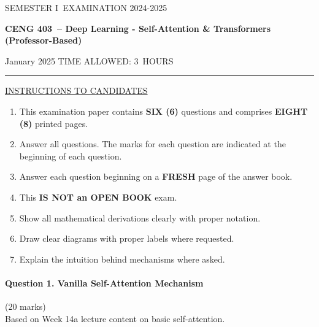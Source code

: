 \documentclass[12pt]{article}
\newcommand{\masunitnumber}{CENG 403}
\newcommand{\examdate}{January 2025}
\newcommand{\academicyear}{2024-2025}
\newcommand{\semester}{I}
\newcommand{\coursename}{Deep Learning - Self-Attention \& Transformers (Professor-Based)}
\newcommand{\numberofhours}{3}
\begin{document}
\setlength{\headsep}{5truemm}
\setlength{\headheight}{14.5truemm}
\setlength{\voffset}{-0.45truein}
\renewcommand{\headrulewidth}{0.0pt}
\begin{center}
SEMESTER \semester\ EXAMINATION \academicyear
\end{center}
\begin{center}
{\bf \masunitnumber\ -- \coursename}
\end{center}
\vspace{20truemm}
\noindent \examdate\hspace{45truemm} TIME ALLOWED: \numberofhours\ HOURS
\vspace{19truemm}
\hrule
\vspace{19truemm}
\noindent\underline{INSTRUCTIONS TO CANDIDATES}
\vspace{8truemm}
\begin{enumerate}
\item This examination paper contains {\bf SIX (6)} questions and comprises 
{\bf EIGHT (8)} printed pages.
\item Answer all questions. 
The marks for each question are indicated at the beginning of each question.
\item Answer each question beginning on a {\bf FRESH} page of the answer book.
\item This {\bf IS NOT an OPEN BOOK} exam.
\item Show all mathematical derivations clearly with proper notation.
\item Draw clear diagrams with proper labels where requested.
\item Explain the intuition behind mechanisms where asked.
\end{enumerate}
\newpage
\lhead{}
\rhead{\masunitnumber}
\chead{}
\lfoot{}
\cfoot{\thepage}
\rfoot{}
\setlength{\footskip}{45pt}

\paragraph{Question 1. Vanilla Self-Attention Mechanism}\hfill (20 marks)\\
Based on Week 14a lecture content on basic self-attention.
\end{document}
